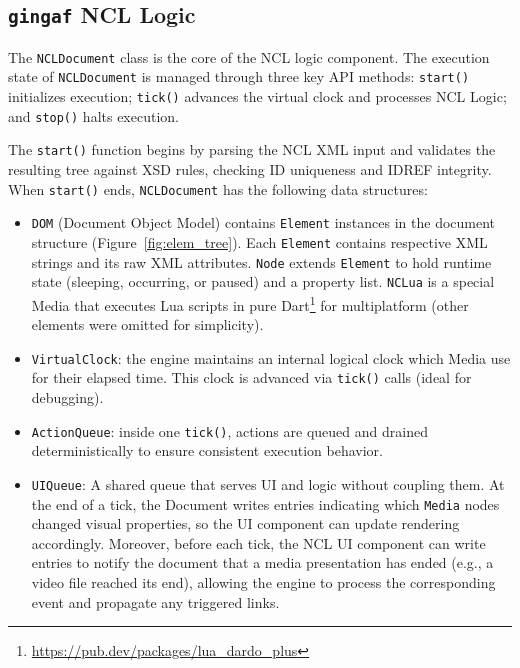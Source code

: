 \documentclass[sigconf,authorversion,review,authordraft]{acmart}
\newcommand{\projectname}{\texttt{gingaf}}
\begin{document}
\subsection{\projectname{} NCL Logic}
\label{sec:ncllogic}

The \texttt{NCLDocument} class is the core of the NCL logic component. The execution state of \texttt{NCLDocument} is managed through three key API methods: \texttt{start()} initializes execution; \texttt{tick()} advances the virtual clock and processes NCL Logic; and \texttt{stop()} halts execution.

The \texttt{start()} function begins by parsing the NCL XML input and validates the resulting tree against XSD rules, checking ID uniqueness and IDREF integrity. When \texttt{start()} ends, \texttt{NCLDocument} has the following data structures:
\begin{itemize}
  \item \texttt{DOM} (Document Object Model) contains \texttt{Element} instances in the document structure (Figure~\ref{fig:elem_tree}). Each \texttt{Element} contains respective XML strings and its raw XML attributes. \texttt{Node} extends \texttt{Element} to hold runtime state (sleeping, occurring, or paused) and a property list. \texttt{NCLua} is a special Media that executes Lua scripts in pure Dart\footnote{\url{https://pub.dev/packages/lua_dardo_plus}} for multiplatform (other elements were omitted for simplicity).
  \item \texttt{VirtualClock}: the engine maintains an internal logical clock which Media use for their elapsed time. This clock is advanced via \texttt{tick()} calls (ideal for debugging).
  \item \texttt{ActionQueue}: inside one \texttt{tick()}, actions are queued and drained deterministically to ensure consistent execution behavior.
  \item \texttt{UIQueue}: A shared queue that serves UI and logic without coupling them. At the end of a tick, the Document writes entries indicating which \texttt{Media} nodes changed visual properties, so the UI component can update rendering accordingly. Moreover, before each tick, the NCL UI component can write entries to notify the document that a media presentation has ended (e.g., a video file reached its end), allowing the engine to process the corresponding event and propagate any triggered links.
\end{itemize}
\end{document}
